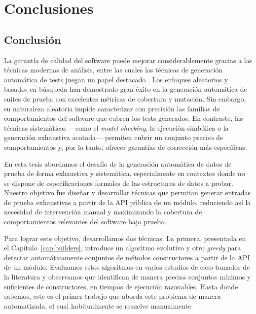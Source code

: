 \chapter{Conclusiones}
\label{cap:conclutions}

\section*{Conclusión}

La garantía de calidad del software puede mejorar considerablemente gracias a las técnicas modernas de análisis, 
entre las cuales las técnicas de generación automática de tests juegan un papel destacado \cite{Cadar08, Luckow14, Fraser11, Pacheco07, Ma15, goGodefroid05, Marinov01, Boyapati02,Godefroid12}. 
Los enfoques aleatorios y basados en búsqueda han demostrado gran éxito en la generación automática de suites de prueba con excelentes métricas de cobertura y mutación. 
Sin embargo, su naturaleza aleatoria impide caracterizar con precisión las familias de comportamientos del software que cubren los tests generados. 
En contraste, las técnicas sistemáticas —como el \emph{model checking}, la ejecución simbólica o la generación exhaustiva acotada— permiten cubrir un conjunto preciso de comportamientos 
y, por lo tanto, ofrecer garantías de corrección más específicas.

En esta tesis abordamos el desafío de la generación automática de datos de prueba de forma exhaustiva y sistemática, 
especialmente en contextos donde no se dispone de especificaciones formales de las estructuras de datos a probar. 
Nuestro objetivo fue diseñar y desarrollar técnicas que permitan generar entradas de prueba exhaustivas a partir de la API pública de un módulo, 
reduciendo así la necesidad de intervención manual y maximizando la cobertura de comportamientos relevantes del software bajo prueba.

Para lograr este objetivo, desarrollamos dos técnicas. La primera, presentada en el Capítulo~\ref{cap:builders}, 
introduce un algoritmo evolutivo y otro \emph{greedy} para detectar automáticamente conjuntos de métodos constructores a partir de la API de un módulo. 
Evaluamos estos algoritmos en varios estudios de caso tomados de la literatura y observamos que identifican de manera precisa conjuntos mínimos y suficientes de constructores, 
en tiempos de ejecución razonables. Hasta donde sabemos, este es el primer trabajo que aborda este problema de manera automatizada, 
el cual habitualmente se resuelve manualmente.

